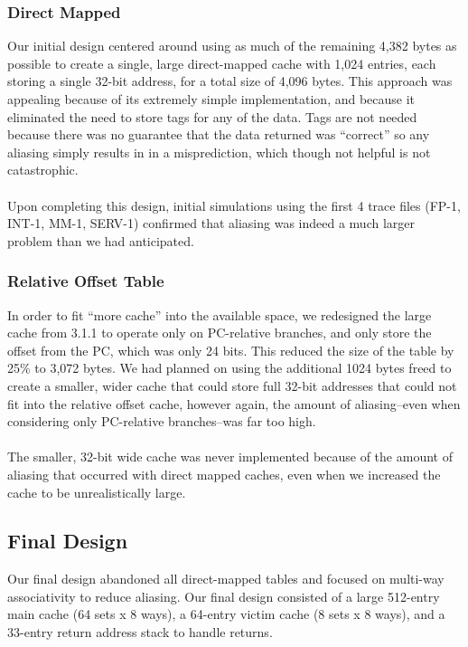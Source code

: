 \documentclass[twocolumn]{article}
\begin{document}
\subsubsection{Direct Mapped}
Our initial design centered around using as much of the remaining 4,382 bytes as possible to create a single, large direct-mapped cache with 1,024 entries, each storing a single 32-bit address, for a total size of 4,096 bytes.  This approach was appealing because of its extremely simple implementation, and because it eliminated the need to store tags for any of the data.  Tags are not needed because there was no guarantee that the data returned was ``correct'' so any aliasing simply results in in a misprediction, which though not helpful is not catastrophic. \\\\
Upon completing this design, initial simulations using the first 4 trace files (FP-1, INT-1, MM-1, SERV-1) confirmed that aliasing was indeed a much larger problem than we had anticipated.

\subsubsection{Relative Offset Table}
In order to fit ``more cache'' into the available space, we redesigned the large cache from 3.1.1 to operate only on PC-relative branches, and only store the offset from the PC, which was only 24 bits.  This reduced the size of the table by 25\% to 3,072 bytes.  We had planned on using the additional 1024 bytes freed to create a smaller, wider cache that could store full 32-bit addresses that could not fit into the relative offset cache, however again, the amount of aliasing--even when considering only PC-relative branches--was far too high.\\\\
The smaller, 32-bit wide cache was never implemented because of the amount of aliasing that occurred with direct mapped caches, even when we increased the cache to be unrealistically large. 

\subsection{Final Design}
Our final design abandoned all direct-mapped tables and focused on multi-way associativity to reduce aliasing.  Our final design consisted of a large 512-entry main cache (64 sets x 8 ways), a 64-entry victim cache (8 sets x 8 ways), and a 33-entry return address stack to handle returns. 
\end{document}

